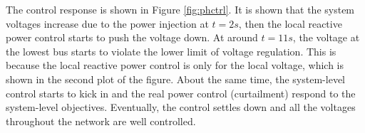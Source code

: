 \documentclass{article}
\begin{document}
The control response is shown in Figure \ref{fig:phctrl}. It is shown that the system voltages increase due to the power injection at $t=2s$, then the local reactive power control starts to push the voltage down. At around $t=11s$, the voltage at the lowest bus starts to violate the lower limit of voltage regulation. This is because the local reactive power control is only for the local voltage, which is shown in the second plot of the figure. About the same time, the system-level control starts to kick in and the real power control (curtailment) respond to the system-level objectives. Eventually, the control settles down and all the voltages throughout the network are well controlled.  

\begin{figure}[ht]
    \centering
    \quad
\end{figure}
\end{document}
